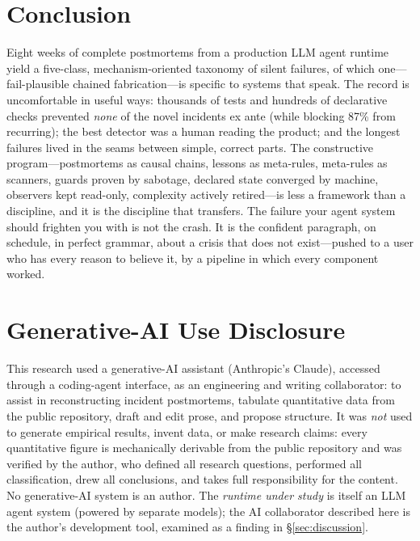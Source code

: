 \documentclass[conference]{IEEEtran}
\begin{document}
\section{Conclusion}
Eight weeks of complete postmortems from a production LLM agent runtime
yield a five-class, mechanism-oriented taxonomy of silent failures, of
which one---fail-plausible chained fabrication---is specific to systems
that speak. The record is uncomfortable in useful ways: thousands of tests
and hundreds of declarative checks prevented \emph{none} of the novel
incidents ex ante (while blocking 87\% from recurring); the best detector
was a human reading the product; and the longest failures lived in the
seams between simple, correct parts. The constructive
program---postmortems as causal chains, lessons as meta-rules, meta-rules
as scanners, guards proven by sabotage, declared state converged by
machine, observers kept read-only, complexity actively retired---is less a
framework than a discipline, and it is the discipline that transfers. The
failure your agent system should frighten you with is not the crash. It is
the confident paragraph, on schedule, in perfect grammar, about a crisis
that does not exist---pushed to a user who has every reason to believe it,
by a pipeline in which every component worked.

\section*{Generative-AI Use Disclosure}
This research used a generative-AI assistant (Anthropic's Claude), accessed
through a coding-agent interface, as an engineering and writing
collaborator: to assist in reconstructing incident postmortems, tabulate
quantitative data from the public repository, draft and edit prose, and
propose structure. It was \emph{not} used to generate empirical results,
invent data, or make research claims: every quantitative figure is
mechanically derivable from the public repository and was verified by the
author, who defined all research questions, performed all classification,
drew all conclusions, and takes full responsibility for the content. No
generative-AI system is an author. The \emph{runtime under study} is itself
an LLM agent system (powered by separate models); the AI collaborator
described here is the author's development tool, examined as a finding in
\S\ref{sec:discussion}.
\end{document}
